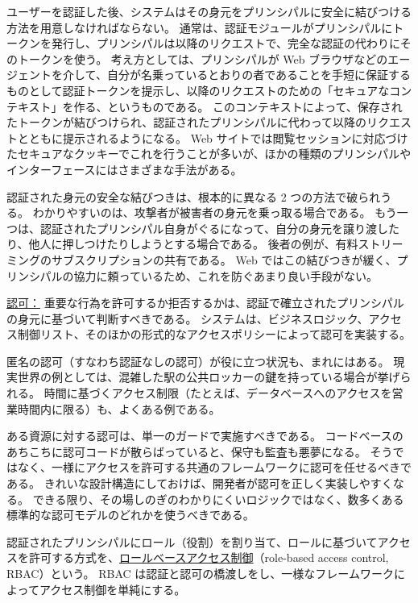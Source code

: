 \documentclass[uplatex]{jsarticle}
\def\label#1{}%
\begin{document}
ユーザーを認証した後、システムはその身元をプリンシパルに安全に結びつける方法を用意しなければならない。
通常は、認証モジュールがプリンシパルにトークンを発行し、プリンシパルは以降のリクエストで、完全な認証の代わりにそのトークンを使う。
考え方としては、プリンシパルが Web ブラウザなどのエージェントを介して、自分が名乗っているとおりの者であることを手短に保証するものとして認証トークンを提示し、以降のリクエストのための「セキュアなコンテキスト」を作る、というものである。
このコンテキストによって、保存されたトークンが結びつけられ、認証されたプリンシパルに代わって以降のリクエストとともに提示されるようになる。
Web サイトでは閲覧セッションに対応づけたセキュアなクッキーでこれを行うことが多いが、ほかの種類のプリンシパルやインターフェースにはさまざまな手法がある。

認証された身元の安全な結びつきは、根本的に異なる 2 つの方法で破られうる。
わかりやすいのは、攻撃者が被害者の身元を乗っ取る場合である。
もう一つは、認証されたプリンシパル自身がぐるになって、自分の身元を譲り渡したり、他人に押しつけたりしようとする場合である。
後者の例が、有料ストリーミングのサブスクリプションの共有である。
Web ではこの結びつきが緩く、プリンシパルの協力に頼っているため、これを防ぐあまり良い手段がない。

\underline{認可：}
重要な行為を許可するか拒否するかは、認証で確立されたプリンシパルの身元に基づいて判断すべきである。
システムは、ビジネスロジック、アクセス制御リスト、そのほかの形式的なアクセスポリシーによって認可を実装する。

匿名の認可（すなわち認証なしの認可）が役に立つ状況も、まれにはある。
現実世界の例としては、混雑した駅の公共ロッカーの鍵を持っている場合が挙げられる。
時間に基づくアクセス制限（たとえば、データベースへのアクセスを営業時間内に限る）も、よくある例である。

ある資源に対する認可は、単一のガードで実施すべきである。
コードベースのあちこちに認可コードが散らばっていると、保守も監査も悪夢になる。
そうではなく、一様にアクセスを許可する共通のフレームワークに認可を任せるべきである。
きれいな設計構造にしておけば、開発者が認可を正しく実装しやすくなる。
できる限り、その場しのぎのわかりにくいロジックではなく、数多くある標準的な認可モデルのどれかを使うべきである。

\begin{dfn}[ロールベースアクセス制御]\label{dfn:ch1-rbac}
認証されたプリンシパルにロール（役割）を割り当て、ロールに基づいてアクセスを許可する方式を、\underline{ロールベースアクセス制御}（role-based access control, RBAC）という。
RBAC は認証と認可の橋渡しをし、一様なフレームワークによってアクセス制御を単純にする。
\end{dfn}
\end{document}
